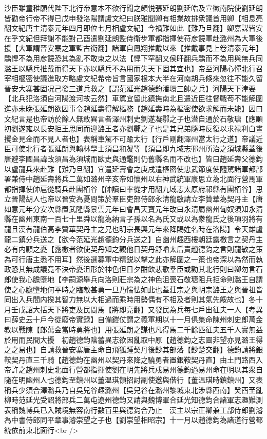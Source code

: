 沙臣雖童稚願代陛下北行帝意本不欲行聞之頗悦張延朗劉延皓及宣徽南院使劉延朗皆勸帝行帝不得已戊申發洛陽謂盧文紀曰朕雅聞卿有相業故排衆議首用卿【相息亮翻文紀唐主清泰元年四月即位七月相盧文紀】今禍難如此【難乃旦翻】卿嘉謀皆安在乎文紀但拜謝不能對己酉遣劉延朗監侍衛步軍都指揮使苻彦饒軍赴潞州為大軍後援【大軍謂晉安寨之軍監古銜翻】諸軍自鳳翔推戴以來【推戴事見上卷清泰元年】驕悍不為用彦饒恐其為亂不敢束之以法【悍下罕翻又侯旰翻兵驕而不為用與無兵同潞王以驕兵推戴而得天下亦以驕兵不為用而失天下固其宜也】帝至河陽心憚北行召宰相樞密使議進取方略盧文紀希帝旨言國家根本大半在河南胡兵倏來忽往不能久留晉安大寨甚固况己發三道兵救之【謂范延光趙德鈞潘環三帥之兵】河陽天下津要【北兵犯洛須自河陽渡河故云然】車駕宜留此鎮撫南北且遣近臣往督戰苟不能解圍進亦未晩張延朗欲因事令趙延壽得解樞務【趙延壽時為樞密使欲求解而未能】因曰文紀言是也帝訪於餘人無敢異言者澤州刺史劉遂凝鄩之子也潜自通於石敬瑭【應順初劉遂雍以長安拒王思同而迎潞王者亦劉鄩之子也是其兄弟隨時反復以求禄利白晝攫金見金而不見人者也】表稱車駕不可踰太行【行戶剛翻澤州當太行之道】帝議近臣可使北行者張延朗與翰林學士須昌和凝等【須昌即九域志鄆州所治之須城縣蓋後唐避李國昌諱改須昌為須城而歐史與通鑑則仍舊縣名而不改也】皆曰趙延壽父德鈞以盧龍兵來赴難【難乃旦翻】宜遣延壽會之庚戌遣樞密使忠武節度使隨駕諸軍都部署兼侍中趙延壽將兵二萬如潞州辛亥帝如懷州以右神武統軍康思立為北面行營馬軍都指揮使帥扈從騎兵赴團栢谷【帥讀曰率從才用翻九域志太原府祁縣有團栢谷】思立晉陽胡人也帝以晉安為憂問策於羣臣吏部侍郎永清龍敏請立李贊華為契丹主【唐如意元年分安次縣置武隆縣景雲元年曰會昌天寶元年改曰永清屬幽州匈奴須知永清縣在幽州東南一百七十里舜以龍為納言子孫以名為氏又或以為豢龍氏之後項羽將有龍且漢有龍伯高李贊華契丹主之兄也明宗長興元年來降賜姓名時在洛陽】令天雄盧龍二鎮分兵送之【欲今范延光趙德鈞分兵送之】自幽州趣西樓朝廷露檄言之契丹主必有内顧之憂【露檄者欲使契丹知之觀他日契丹舒嚕太后責趙德鈞之言則龍敏之策為可行唐主悉不用耳】然後選募軍中精鋭以擊之此亦解圍之一策也帝深以為然而執政恐其無成議竟不決帝憂沮形於神色但日夕酣飲悲歌羣臣或勸其北行則曰卿勿言石郎使我心膽墮地【李嗣源舉兵向洛則莊宗為之神色沮喪石敬瑭阻兵拒命則潞王自謂使之心膽墮地何平時之臨敵甚勇一旦乃惴怯如此也蓋莊宗之與明宗潞王之與晉祖皆同出入兵間内揆其智力無以大相過而乘時用勢偶有不相及者則其氣先餒故也】冬十月壬戌詔大括天下將吏及民間馬【將即亮翻】又發民為兵每七戶出征夫一人【考異曰薛史云十戶今從廢帝實録】自備鎧仗謂之義軍期以十一月俱集命陳州刺史郎萬金教以戰陳【郎萬金當時勇將也】用張延朗之謀也凡得馬二千餘匹征夫五千人實無益於用而民間大擾　初趙德鈞陰蓄異志欲因亂取中原【趙德鈞之志圖非望亦見潞王得之之易也】自請救晉安寨唐主命自飛狐踵契丹後鈔其部落【鈔楚交翻】德鈞請將銀鞍契丹直三千騎【趙德鈞在幽州以契丹來降之驍勇者置銀鞍契丹直】由土門路西入帝許之趙州刺史北面行營都指揮使劉在明先將兵戍易州德鈞過易州命在明以其衆自隨在明幽州人也德鈞至鎮州以董温琪領招討副使邀與偕行【董温琪時鎮鎮州】又表稱兵少須合澤潞兵乃自吳兒谷趣潞州【吳兒谷在潞州黎城東北涉縣西南】癸酉至亂柳時范延光受詔將部兵二萬屯遼州德鈞又請與魏博軍合延光知德鈞合諸軍志趣難測表稱魏博兵已入賊境無容南行數百里與德鈞合乃止　漢主以宗正卿兼工部侍郎劉濬為中書侍郎同平章事濬崇望之子也【劉崇望相昭宗】十一月以趙德鈞為諸道行營都統依前東北面行<br />
